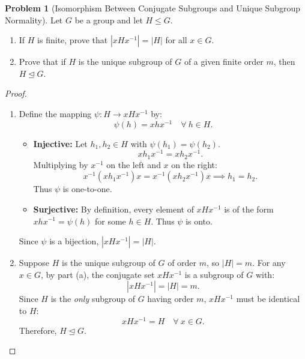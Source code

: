 \documentclass[12pt]{article}
\theoremstyle{definition}
\newtheorem{problem}[definition]{Problem}
\theoremstyle{plain}
\begin{document}
\begin{problem}[Isomorphism Between Conjugate Subgroups and Unique Subgroup Normality]
Let $G$ be a group and let $H \le G$.
\begin{enumerate}[label=(\alph*)]
    \item If $H$ is finite, prove that $|xHx^{-1}| = |H|$ for all $x \in G$.
    \item Prove that if $H$ is the unique subgroup of $G$ of a given finite order $m$, then $H \trianglelefteq G$.
\end{enumerate}
\end{problem}
\begin{proof}
\begin{enumerate}[label=(\alph*)]
    \item Define the mapping $\psi: H \longrightarrow xHx^{-1}$ by:
    \[
    \psi(h) = xhx^{-1} \quad \forall\ h \in H.
    \]
    \begin{itemize}
        \item \textbf{Injective:} Let $h_1, h_2 \in H$ with $\psi(h_1) = \psi(h_2)$.
        \[
        xh_1 x^{-1} = xh_2 x^{-1}.
        \]
        Multiplying by $x^{-1}$ on the left and $x$ on the right:
        \[
        x^{-1}(xh_1 x^{-1})x = x^{-1}(xh_2 x^{-1})x \implies h_1 = h_2.
        \]
        Thus $\psi$ is one-to-one.
        \item \textbf{Surjective:} By definition, every element of $xHx^{-1}$ is of the form $xhx^{-1} = \psi(h)$ for some $h \in H$. Thus $\psi$ is onto.
    \end{itemize}
    Since $\psi$ is a bijection, $|xHx^{-1}| = |H|$.
    
    \item Suppose $H$ is the unique subgroup of $G$ of order $m$, so $|H| = m$.
    For any $x \in G$, by part (a), the conjugate set $xHx^{-1}$ is a subgroup of $G$ with:
    \[
    |xHx^{-1}| = |H| = m.
    \]
    Since $H$ is the \emph{only} subgroup of $G$ having order $m$, $xHx^{-1}$ must be identical to $H$:
    \[
    xHx^{-1} = H \quad \forall\ x \in G.
    \]
    Therefore, $H \trianglelefteq G$.
\end{enumerate}
\end{proof}
\end{document}

